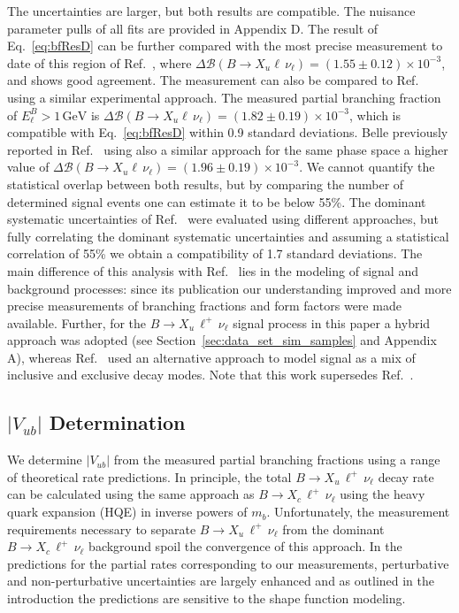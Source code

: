 \documentclass[twocolumn,aps,prd,superscriptaddress,nofootinbib,floatfix,preprintnumbers,a4]{revtex4-1}
\newcommand{\Vub}{V_{ub}}
\newcommand{\bulnu}{\ensuremath{B \to X_u \, \ell^+\, \nu_{\ell}}\xspace}
\newcommand{\bclnu}{\ensuremath{B \to X_c \, \ell^+\, \nu_{\ell}}\xspace}
\begin{document}
The uncertainties are larger, but both results are compatible. The nuisance parameter pulls of all fits are provided in Appendix D. The result of Eq.~\ref{eq:bfResD} can be further compared with the most precise measurement to date of this region of Ref.~\cite{TheBABAR:2016lja}, where \mbox{$\Delta \mathcal{B}(B \to X_u \ell \, \nu_\ell) = \left( 1.55 \pm 0.12 \right) \times 10^{-3}$}, and shows good agreement. The measurement can also be compared to Ref.~\cite{Lees:2011fv} using a similar experimental approach. The measured partial branching fraction of \mbox{$E_\ell^B > 1 \, \text{GeV}$} is \mbox{$\Delta \mathcal{B}(B \to X_u \ell \, \nu_\ell) = \left( 1.82 \pm 0.19 \right) \times 10^{-3}$}, which is compatible with Eq.~\ref{eq:bfResD} within 0.9 standard deviations. Belle previously reported in Ref.~\cite{Urquijo:2009tp} using also a similar approach for the same phase space a higher value of \mbox{$\Delta \mathcal{B}(B \to X_u \ell \, \nu_\ell) = \left( 1.96 \pm 0.19 \right) \times 10^{-3}$}. We cannot quantify the statistical overlap between both results, but by comparing the number of determined signal events one can estimate it to be below 55\%. The dominant systematic uncertainties of Ref.~\cite{Urquijo:2009tp} were evaluated using different approaches, but fully correlating the dominant systematic uncertainties and assuming a statistical correlation of 55\% we obtain a compatibility of 1.7 standard deviations. The main difference of this analysis with Ref.~\cite{Urquijo:2009tp} lies in the modeling of signal and background processes: since its publication our understanding improved and more precise measurements of branching fractions and form factors were made available. Further, for the \bulnu signal process in this paper a hybrid approach was adopted (see Section~\ref{sec:data_set_sim_samples} and Appendix A), whereas Ref.~\cite{Urquijo:2009tp} used an alternative approach to model signal as a mix of inclusive and exclusive decay modes. Note that this work supersedes Ref.~\cite{Urquijo:2009tp}. 



\subsection{$|\Vub|$ Determination}

We determine $|\Vub|$ from the measured partial branching fractions using a range of theoretical rate predictions. In principle, the total \bulnu decay rate can be calculated using the same approach as \bclnu using the heavy quark expansion (HQE) in inverse powers of $m_b$. Unfortunately, the measurement requirements necessary to separate \bulnu from the dominant \bclnu background spoil the convergence of this approach. In the predictions for the partial rates corresponding to our measurements, perturbative and non-perturbative uncertainties are largely enhanced and as outlined in the introduction the predictions are sensitive to the shape function modeling.
\end{document}
